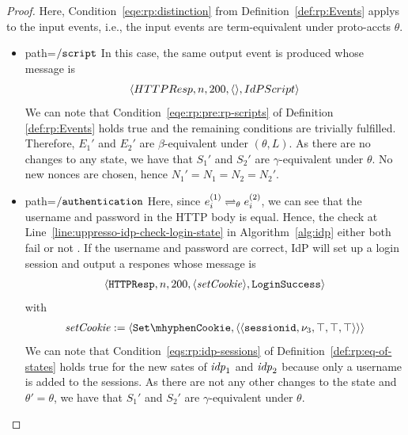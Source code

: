 \begin{proof}
    Here, Condition~\ref{eqe:rp:distinction} from Definition~\ref{def:rp:Events} applys to the input events,
    i.e., the input events are term-equivalent under proto-accts $\theta$. 
    \begin{itemize}
      \item path=$\mathtt{/script}$ 
        In this case, the same output event is produced whose message is 
        \begin{equation}
          \begin{aligned}
            \langle {{}HTTPResp,n,200,\langle {{}} \rangle,IdPScript} \rangle
          \end{aligned}
        \end{equation}
        We can note that Condition~\ref{eqe:rp:pre:rp-scripts} of Definition \ref{def:rp:Events} holds true and the remaining conditions are trivially fulfilled.
        Therefore, $E_1\prime$ and $E_2\prime$ are $\beta$-equivalent under $(\theta, L)$. 
        As there are no changes to any state, we have that $S_1\prime$ and $S_2\prime$ are $\gamma$-equivalent under $\theta$. 
        No new nonces are chosen, hence $N_1\prime=N_1=N_2=N_2\prime$.
      \item path=$\mathtt{/authentication}$ 
        Here, since $e_i^{(1)} \rightleftharpoons_{\theta} e_i^{(2)}$, we can see that the username and password in the HTTP body is equal. 
        Hence, the check at Line~\ref{line:uppresso-idp-check-login-state} in Algorithm~\ref{alg:idp} either both fail or not . 
        If the username and password are correct, IdP will set up a login session and output a respones whose message is 
        \begin{align*}
          \langle {{}\mathtt{HTTPResp},n,200,\langle\mathit{setCookie}\rangle,\mathtt{LoginSuccess}} \rangle
        \end{align*}
        with
        \begin{align*}
          \mi{setCookie} := \myangle{\cSetCookie, \myangle{\myangle{\str{sessionid}, \nu_3, \True, \True, \True}}} \\
        \end{align*}
        We can note that Condition~\ref{eqs:rp:idp-sessions} of Definition~\ref{def:rp:eq-of-states} holds true for the new sates of $\mathit{idp}_1$ and $\mathit{idp}_2$ because only a username is added to the sessions.
        As there are not any other changes to the state and $\theta\prime = \theta$, we have that $S_1\prime$ and $S_2\prime$ are $\gamma$-equivalent under $\theta$. 
        

\end{itemize}
\end{proof}
